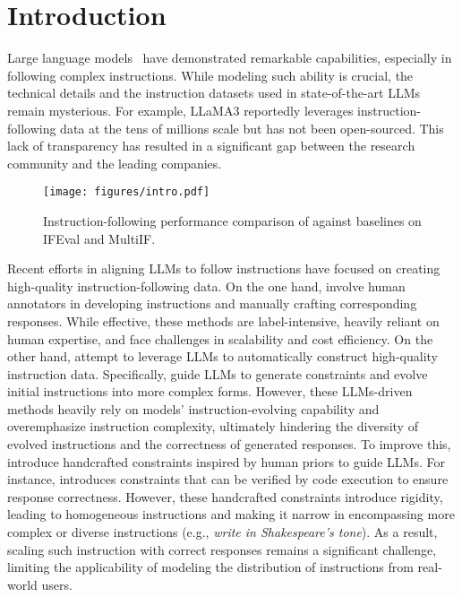 \section{Introduction}

Large language models~\citep{grattafiori2024llama3herdmodels, openai2024gpt4technicalreport} have demonstrated remarkable capabilities, especially in following complex instructions. While modeling such ability is crucial, the technical details and the instruction datasets used in state-of-the-art LLMs remain mysterious. 
For example, LLaMA3 \citep{grattafiori2024llama3herdmodels} reportedly leverages instruction-following data at the tens of millions scale but has not been open-sourced. This lack of transparency has resulted in a significant gap between the research community and the leading companies.

\begin{figure}[!t]
    \centering
    \texttt{[image: figures/intro.pdf]}
    \caption{Instruction-following performance comparison of \method against baselines on IFEval and MultiIF.}
    \label{fig:intro_performance}
    \vspace{-3mm}
\end{figure}

Recent efforts in aligning LLMs to follow instructions have focused on creating high-quality instruction-following data. 
On the one hand, \citet{wei2021finetuned, no_robots,jiang2023followbench} involve human annotators in developing instructions and manually crafting corresponding responses. While effective, these methods are label-intensive, heavily reliant on human expertise, and face challenges in scalability and cost efficiency.
On the other hand, \citet{xu2023wizardlm,wang-etal-2023-self-instruct,sun2024conifer,dong2024self} attempt to leverage LLMs to automatically construct high-quality instruction data.
Specifically, \citet{xu2023wizardlm,sun2024conifer} guide LLMs to generate constraints and evolve initial instructions into more complex forms.
However, these LLMs-driven methods heavily rely on models' instruction-evolving capability and overemphasize instruction complexity, ultimately hindering the diversity of evolved instructions and the correctness of generated responses.
To improve this, \citet{wang-etal-2023-self-instruct,dong2024self} introduce handcrafted constraints inspired by human priors to guide LLMs.
For instance, \citet{dong2024self} introduces constraints that can be verified by code execution to ensure response correctness.
However, these handcrafted constraints introduce rigidity, leading to homogeneous instructions and making it narrow in encompassing more complex or diverse instructions (e.g., \textit{write in Shakespeare's tone}).
As a result, scaling such instruction with correct responses remains a significant challenge, limiting the applicability of modeling the distribution of instructions from real-world users.



